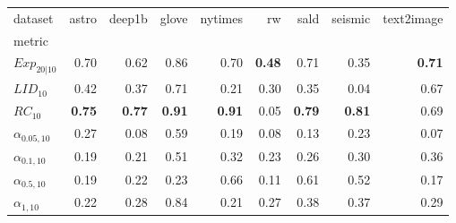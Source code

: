 \begin{tabular}{lrrrrrrrr}
dataset & astro & deep1b & glove & nytimes & rw & sald & seismic & text2image \\
metric &  &  &  &  &  &  &  &  \\
$Exp_{20|10}$ & 0.70 & 0.62 & 0.86 & 0.70 & \textbf{0.48} & 0.71 & 0.35 & \textbf{0.71} \\
$LID_{10}$ & 0.42 & 0.37 & 0.71 & 0.21 & 0.30 & 0.35 & 0.04 & 0.67 \\
$RC_{10}$ & \textbf{0.75} & \textbf{0.77} & \textbf{0.91} & \textbf{0.91} & 0.05 & \textbf{0.79} & \textbf{0.81} & 0.69 \\
$\alpha_{0.05, 10}$ & 0.27 & 0.08 & 0.59 & 0.19 & 0.08 & 0.13 & 0.23 & 0.07 \\
$\alpha_{0.1, 10}$ & 0.19 & 0.21 & 0.51 & 0.32 & 0.23 & 0.26 & 0.30 & 0.36 \\
$\alpha_{0.5, 10}$ & 0.19 & 0.22 & 0.23 & 0.66 & 0.11 & 0.61 & 0.52 & 0.17 \\
$\alpha_{1, 10}$ & 0.22 & 0.28 & 0.84 & 0.21 & 0.27 & 0.38 & 0.37 & 0.29 \\
\end{tabular}
